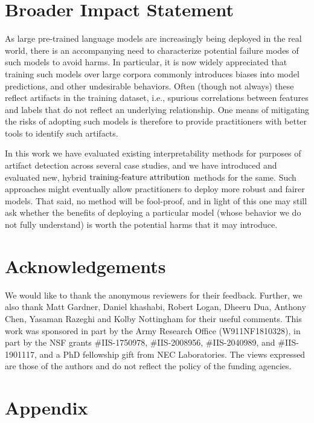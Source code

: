 \documentclass[11pt]{article}
\begin{document}
\section*{Broader Impact Statement}
As large pre-trained language models %
are increasingly being deployed in the real world, 
there is an accompanying need to characterize potential failure modes of such models to avoid harms.
In particular, it is now widely appreciated that training such models over large corpora commonly introduces biases into model predictions, and other undesirable behaviors.
Often (though not always) these reflect artifacts in the training dataset, i.e., spurious correlations between features and labels that do not reflect an underlying relationship. 
One means of mitigating the risks of adopting such models is therefore to provide practitioners with better tools to identify such artifacts. 

In this work we have evaluated existing interpretability methods for purposes of artifact detection across several case studies, and we have introduced and evaluated new, hybrid $\text{training-feature attribution}$ methods for the same. 
Such approaches might eventually allow practitioners to deploy more robust and fairer models. 
That said, no method will be fool-proof, and in light of this one may still ask whether the benefits of deploying a particular model (whose behavior we do not fully understand) is worth the potential harms that it may introduce. 

\section*{Acknowledgements}

We would like to thank the anonymous reviewers for their feedback. 
Further, we also thank Matt Gardner, Daniel khashabi, Robert Logan, Dheeru Dua, Anthony Chen, Yasaman Razeghi and Kolby Nottingham for their useful comments. 
This work was sponsored in part by the Army Research Office (W911NF1810328), in part by the NSF grants \#IIS-1750978, \#IIS-2008956, \#IIS-2040989, and \#IIS-1901117, and a PhD fellowship gift from NEC Laboratories. 
The views expressed are those of the authors and do not reflect the policy of the funding agencies.

\clearpage



\clearpage
\section*{Appendix}
\appendix


\end{document}
